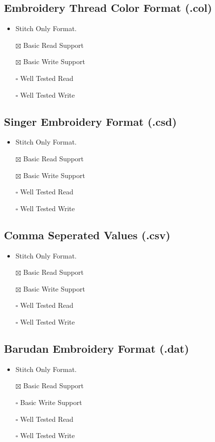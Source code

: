 \documentclass[onesize, a4paper]{refart}
\providecommand{\tightlist}{\setlength{\itemsep}{0pt}\setlength{\parskip}{0pt}}
\begin{document}
\subsection{Embroidery Thread Color Format (.col)}

\begin{itemize}
\tightlist
\item Stitch Only Format.
\item[$\boxtimes$] Basic Read Support
\item[$\boxtimes$] Basic Write Support
\item[$\square$] Well Tested Read
\item[$\square$] Well Tested Write
\end{itemize}

\subsection{Singer Embroidery Format (.csd)}

\begin{itemize}
\tightlist
\item Stitch Only Format.
\item[$\boxtimes$] Basic Read Support
\item[$\boxtimes$] Basic Write Support
\item[$\square$] Well Tested Read
\item[$\square$] Well Tested Write
\end{itemize}

\subsection{Comma Seperated Values (.csv)}

\begin{itemize}
\tightlist
\item Stitch Only Format.
\item[$\boxtimes$] Basic Read Support
\item[$\boxtimes$] Basic Write Support
\item[$\square$] Well Tested Read
\item[$\square$] Well Tested Write
\end{itemize}

\subsection{Barudan Embroidery Format (.dat)}

\begin{itemize}
\tightlist
\item Stitch Only Format.
\item[$\boxtimes$] Basic Read Support
\item[$\square$] Basic Write Support
\item[$\square$] Well Tested Read
\item[$\square$] Well Tested Write
\end{itemize}
\end{document}
